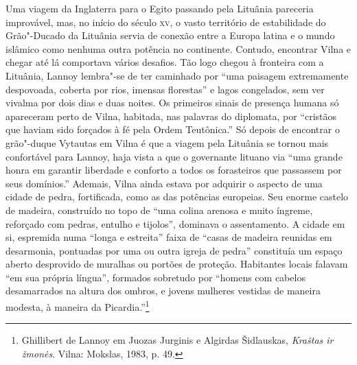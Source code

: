 Uma viagem da Inglaterra para o Egito passando pela Lituânia pareceria
improvável, mas, no início do século \textsc{xv}, o vasto território de
estabilidade do Grão"-Ducado da Lituânia servia de conexão entre a Europa
latina e o mundo islâmico como nenhuma outra potência no continente.
Contudo, encontrar Vilna e chegar até lá comportava vários desafios. Tão
logo chegou à fronteira com a Lituânia, Lannoy lembra"-se de ter
caminhado por ``uma paisagem extremamente despovoada, coberta por rios,
imensas florestas'' e lagos congelados, sem ver vivalma por dois dias e
duas noites. Os primeiros sinais de presença humana só apareceram perto
de Vilna, habitada, nas palavras do diplomata, por ``cristãos que haviam
sido forçados à fé pela Ordem Teutônica.'' Só depois de encontrar o
grão"-duque Vytautas em Vilna é que a viagem pela Lituânia se tornou mais
confortável para Lannoy, haja vista a que o governante lituano via ``uma
grande honra em garantir liberdade e conforto a todos os forasteiros que
passassem por seus domínios.'' Ademais, Vilna ainda estava por adquirir
o aspecto de uma cidade de pedra, fortificada, como as das potências
europeias. Seu enorme castelo de madeira, construído no topo de ``uma
colina arenosa e muito íngreme, reforçado com pedras, entulho e
tijolos'', dominava o assentamento. A cidade em si, espremida numa
``longa e estreita'' faixa de ``casas de madeira reunidas em desarmonia,
pontuadas por uma ou outra igreja de pedra'' constituía um espaço aberto
desprovido de muralhas ou portões de proteção. Habitantes locais falavam
``em sua própria língua'', formados sobretudo por ``homens com cabelos
desamarrados na altura dos ombros, e jovens mulheres vestidas de maneira
modesta, à maneira da Picardia.''\footnote{Ghillibert de Lannoy em Juozas Jurginis e Algirdas Šidlauskas, \textit{Kraštas ir žmonės}. Vilna: Mokslas, 1983, p. 49.}

